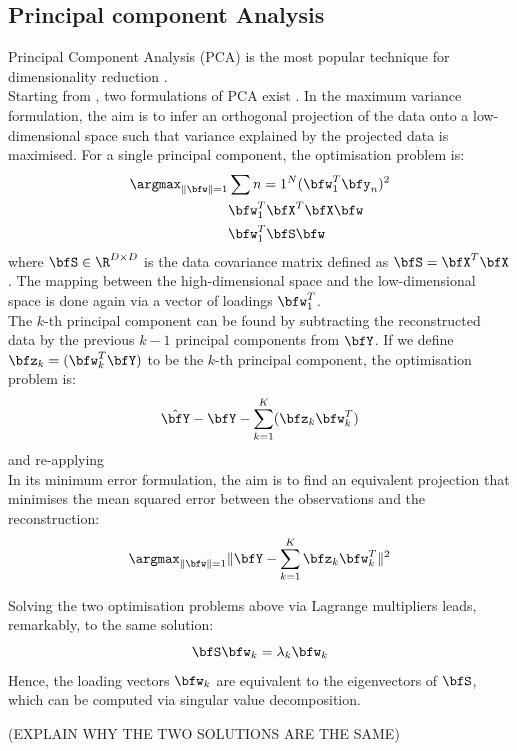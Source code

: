 \subsection{Principal component Analysis}
Principal Component Analysis (PCA) is the most popular technique for dimensionality reduction \cite{Hotelling1933,Ringner2008}.\\
Starting from , two formulations of PCA exist \cite{Bishop}. In the maximum variance formulation, the aim is to infer an orthogonal projection of the data onto a low-dimensional space such that variance explained by the projected data is maximised. For a single principal component, the optimisation problem is:
\begin{align} \label{eq:pca}
	\argmax_{\|\bfw\|=1} & \sum{n=1}^{N} (\bfw_1^T \bfy_n)^2 \\
						 & \bfw_1^T \bfX^T \bfX \bfw \\
						 & \bfw_1^T \bfS \bfw
\end{align}
where $\bfS \in \R^{D \times D}$ is the data covariance matrix defined as $\bfS = \bfX^T \bfX$. The mapping between the high-dimensional space and the low-dimensional space is done again via a vector of loadings $\bfw_1^T$. \\
The $k$-th principal component can be found by subtracting the reconstructed data by the previous $k-1$ principal components from $\bfY$. If we define $\bfz_k=(\bfw_k^T \bfY)$ to be the $k$-th principal component, the optimisation problem is:
\[
	\hat{\bfY} - \bfY - \sum_{k=1}^{K} (\bfz_k \bfw_k^T)
\]
and re-applying \\

In its minimum error formulation, the aim is to find an equivalent projection that minimises the mean squared error between the observations and the reconstruction:
\[
	\argmax_{\|\bfw\|=1} \| \bfY - \sum_{k=1}^{K} \bfz_k \bfw_k^T \|^2
\]


Solving the two optimisation problems above via Lagrange multipliers leads, remarkably, to the same solution\cite{Bishop}:
\begin{equation}
	\bfS \bfw_k = \lambda_k \bfw_k
\end{equation}
Hence, the loading vectors $\bfw_k$ are equivalent to the eigenvectors of $\bfS$, which can be computed via singular value decomposition.

(EXPLAIN WHY THE TWO SOLUTIONS ARE THE SAME) \\

